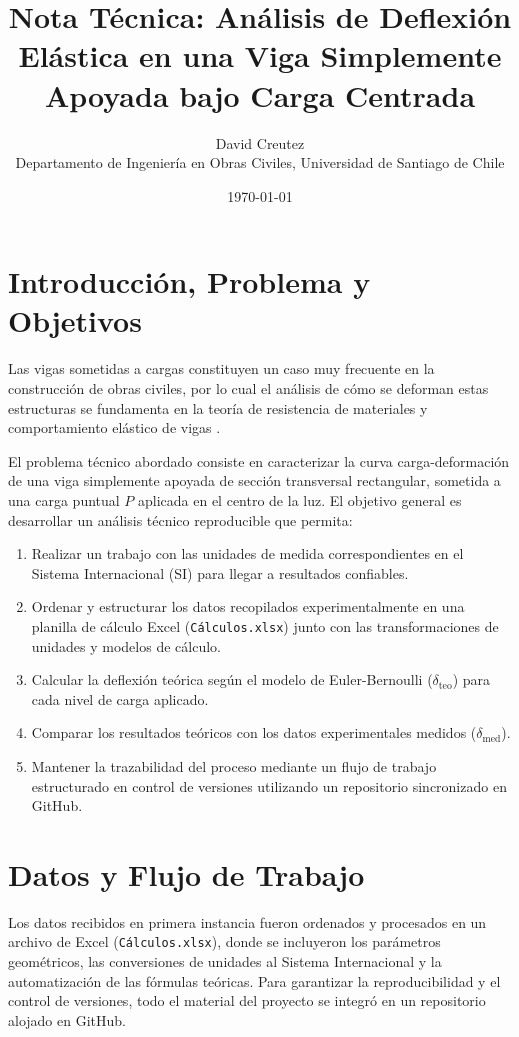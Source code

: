 \documentclass[10pt,letterpaper]{article}
\title{\textbf{Nota Técnica: Análisis de Deflexión Elástica en una Viga Simplemente Apoyada bajo Carga Centrada}}
\author{David Creutez\\
	{\footnotesize Departamento de Ingeniería en Obras Civiles, Universidad de Santiago de Chile}
}
\date{\today}
\begin{document}
\maketitle

\section{Introducción, Problema y Objetivos}

Las vigas sometidas a cargas constituyen un caso muy frecuente en la construcción de obras civiles, por lo cual el análisis de cómo se deforman estas estructuras se fundamenta en la teoría de resistencia de materiales y comportamiento elástico de vigas \cite{hibbeler2017mecanica}.

El problema técnico abordado consiste en caracterizar la curva carga-deformación de una viga simplemente apoyada de sección transversal rectangular, sometida a una carga puntual $P$ aplicada en el centro de la luz. El objetivo general es desarrollar un análisis técnico reproducible que permita:
\begin{enumerate}
    \item Realizar un trabajo con las unidades de medida correspondientes en el Sistema Internacional (SI) para llegar a resultados confiables.
    \item Ordenar y estructurar los datos recopilados experimentalmente en una planilla de cálculo Excel (\texttt{Cálculos.xlsx}) junto con las transformaciones de unidades y modelos de cálculo.
    \item Calcular la deflexión teórica según el modelo de Euler-Bernoulli ($\delta_{\text{teo}}$) para cada nivel de carga aplicado.
    \item Comparar los resultados teóricos con los datos experimentales medidos ($\delta_{\text{med}}$).
    \item Mantener la trazabilidad del proceso mediante un flujo de trabajo estructurado en control de versiones utilizando un repositorio sincronizado en GitHub.
\end{enumerate}

\section{Datos y Flujo de Trabajo}

Los datos recibidos en primera instancia fueron ordenados y procesados en un archivo de Excel (\texttt{Cálculos.xlsx}), donde se incluyeron los parámetros geométricos, las conversiones de unidades al Sistema Internacional y la automatización de las fórmulas teóricas. Para garantizar la reproducibilidad y el control de versiones, todo el material del proyecto se integró en un repositorio alojado en GitHub.
\end{document}

